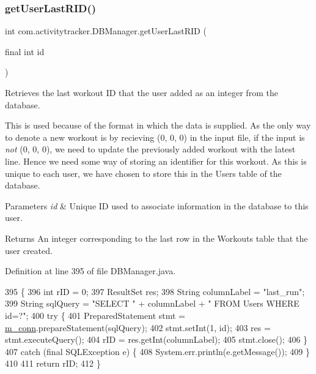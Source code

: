 \subsubsection{\texorpdfstring{get\+User\+Last\+R\+I\+D()}{getUserLastRID()}}
{\footnotesize\ttfamily int com.\+activitytracker.\+D\+B\+Manager.\+get\+User\+Last\+R\+ID (\begin{DoxyParamCaption}\item[{final int}]{id }\end{DoxyParamCaption})}

Retrieves the last workout ID that the user added as an integer from the database.

This is used because of the format in which the data is supplied. As the only way to denote a new workout is by recieving (0, 0, 0) in the input file, if the input is {\itshape not} (0, 0, 0), we need to update the previously added workout with the latest line. Hence we need some way of storing an identifier for this workout. As this is unique to each user, we have chosen to store this in the Users table of the database.


\begin{DoxyParams}{Parameters}
{\em id} & Unique ID used to associate information in the database to this user. \\
\hline
\end{DoxyParams}
\begin{DoxyReturn}{Returns}
An integer corresponding to the last row in the Workouts table that the user created. 
\end{DoxyReturn}


Definition at line 395 of file D\+B\+Manager.\+java.


\begin{DoxyCode}
395                                             \{
396         \textcolor{keywordtype}{int} rID = 0;
397         ResultSet res;
398         String columnLabel = \textcolor{stringliteral}{"last\_run"};
399         String sqlQuery = \textcolor{stringliteral}{"SELECT "} + columnLabel + \textcolor{stringliteral}{" FROM Users WHERE id=?"};
400         \textcolor{keywordflow}{try} \{
401             PreparedStatement stmt = \mbox{\hyperlink{classcom_1_1activitytracker_1_1_d_b_manager_a064088d13ac09eb147fdc19268771521}{m\_conn}}.prepareStatement(sqlQuery);
402             stmt.setInt(1, \textcolor{keywordtype}{id});
403             res = stmt.executeQuery();
404             rID = res.getInt(columnLabel);
405             stmt.close();
406         \}
407         \textcolor{keywordflow}{catch} (\textcolor{keyword}{final} SQLException e) \{
408             System.err.println(e.getMessage());
409         \}
410 
411         \textcolor{keywordflow}{return} rID;
412     \}
\end{DoxyCode}
\mbox{\label{classcom_1_1activitytracker_1_1_d_b_manager_aeab864b072cc08c0521e80ae1f459ca7}} 
